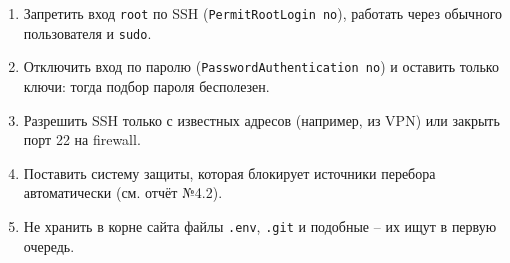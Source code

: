 

\begin{enumerate}
  \item Запретить вход \texttt{root} по SSH (\texttt{PermitRootLogin no}),
  работать через обычного пользователя и \texttt{sudo}.
  \item Отключить вход по паролю (\texttt{PasswordAuthentication no}) и
  оставить только ключи: тогда подбор пароля бесполезен.
  \item Разрешить SSH только с известных адресов (например, из VPN) или
  закрыть порт 22 на firewall.
  \item Поставить систему защиты, которая блокирует источники перебора
  автоматически (см. отчёт №4.2).
  \item Не хранить в корне сайта файлы \texttt{.env}, \texttt{.git}
  и подобные -- их ищут в первую очередь.
\end{enumerate}
